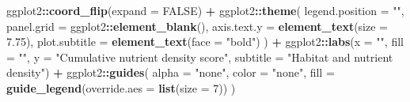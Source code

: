 \documentclass[
]{book}
\newenvironment{Shaded}{\begin{snugshade}}{\end{snugshade}}
\newcommand{\AttributeTok}[1]{\textcolor[rgb]{0.13,0.29,0.53}{#1}}
\newcommand{\ConstantTok}[1]{\textcolor[rgb]{0.56,0.35,0.01}{#1}}
\newcommand{\DecValTok}[1]{\textcolor[rgb]{0.00,0.00,0.81}{#1}}
\newcommand{\FloatTok}[1]{\textcolor[rgb]{0.00,0.00,0.81}{#1}}
\newcommand{\FunctionTok}[1]{\textcolor[rgb]{0.13,0.29,0.53}{\textbf{#1}}}
\newcommand{\NormalTok}[1]{#1}
\newcommand{\SpecialCharTok}[1]{\textcolor[rgb]{0.81,0.36,0.00}{\textbf{#1}}}
\newcommand{\StringTok}[1]{\textcolor[rgb]{0.31,0.60,0.02}{#1}}
\begin{document}
\begin{Shaded}
\begin{Highlighting}[]
\NormalTok{  ggplot2}\SpecialCharTok{::}\FunctionTok{coord\_flip}\NormalTok{(}\AttributeTok{expand =} \ConstantTok{FALSE}\NormalTok{) }\SpecialCharTok{+}
\NormalTok{  ggplot2}\SpecialCharTok{::}\FunctionTok{theme}\NormalTok{(}
    \AttributeTok{legend.position =} \StringTok{""}\NormalTok{,}
    \AttributeTok{panel.grid =}\NormalTok{ ggplot2}\SpecialCharTok{::}\FunctionTok{element\_blank}\NormalTok{(),}
    \AttributeTok{axis.text.y =} \FunctionTok{element\_text}\NormalTok{(}\AttributeTok{size =} \FloatTok{7.75}\NormalTok{),}
    \AttributeTok{plot.subtitle =} \FunctionTok{element\_text}\NormalTok{(}\AttributeTok{face =} \StringTok{"bold"}\NormalTok{)}
\NormalTok{  ) }\SpecialCharTok{+}
\NormalTok{  ggplot2}\SpecialCharTok{::}\FunctionTok{labs}\NormalTok{(}\AttributeTok{x =} \StringTok{""}\NormalTok{, }\AttributeTok{fill =} \StringTok{""}\NormalTok{, }\AttributeTok{y =} \StringTok{"Cumulative nutrient density score"}\NormalTok{, }\AttributeTok{subtitle =} \StringTok{"Habitat and nutrient density"}\NormalTok{) }\SpecialCharTok{+}
\NormalTok{  ggplot2}\SpecialCharTok{::}\FunctionTok{guides}\NormalTok{(}
    \AttributeTok{alpha =} \StringTok{"none"}\NormalTok{,}
    \AttributeTok{color =} \StringTok{"none"}\NormalTok{,}
    \AttributeTok{fill =} \FunctionTok{guide\_legend}\NormalTok{(}\AttributeTok{override.aes =} \FunctionTok{list}\NormalTok{(}\AttributeTok{size =} \DecValTok{7}\NormalTok{))}
\NormalTok{  )}


\end{Highlighting}
\end{Shaded}
\end{document}
